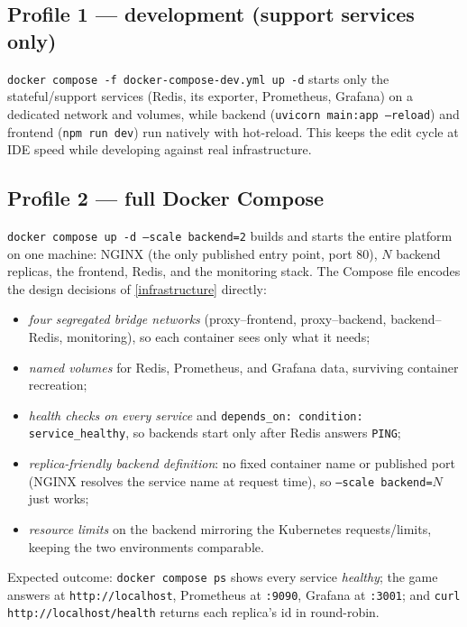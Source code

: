 \documentclass{scrartcl}
\begin{document}
\subsection{Profile 1 --- development (support services only)}

\texttt{docker compose -f docker-compose-dev.yml up -d} starts only the
stateful/support services (Redis, its exporter, Prometheus, Grafana) on a
dedicated network and volumes, while backend
(\texttt{uvicorn main:app --reload}) and frontend
(\texttt{npm run dev}) run natively with hot-reload. This keeps the edit
cycle at IDE speed while developing against real infrastructure.

\subsection{Profile 2 --- full Docker Compose}

\texttt{docker compose up -d --scale backend=2} builds and starts the
entire platform on one machine: NGINX (the only published entry point, port
80), $N$ backend replicas, the frontend, Redis, and the monitoring stack.
The Compose file encodes the design decisions of \cref{infrastructure}
directly:

\begin{itemize}
  \item \emph{four segregated bridge networks} (proxy--frontend,
  proxy--backend, backend--Redis, monitoring), so each container sees only
  what it needs;
  \item \emph{named volumes} for Redis, Prometheus, and Grafana data,
  surviving container recreation;
  \item \emph{health checks on every service} and
  \texttt{depends\_on: condition: service\_healthy}, so backends start
  only after Redis answers \texttt{PING};
  \item \emph{replica-friendly backend definition}: no fixed container
  name or published port (NGINX resolves the service name at request
  time), so \texttt{--scale backend=$N$} just works;
  \item \emph{resource limits} on the backend mirroring the Kubernetes
  requests/limits, keeping the two environments comparable.
\end{itemize}

Expected outcome: \texttt{docker compose ps} shows every service
\emph{healthy}; the game answers at \texttt{http://localhost},
Prometheus at \texttt{:9090}, Grafana at \texttt{:3001}; and
\texttt{curl http://localhost/health} returns each replica's id in
round-robin.
\end{document}
